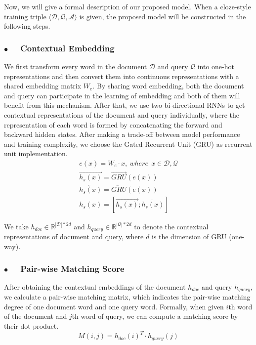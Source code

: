 \documentclass[11pt,a4paper]{article}
\begin{document}
Now, we will give a formal description of our proposed model.
When a cloze-style training triple $\langle \mathcal D, \mathcal Q, \mathcal A \rangle$ is given, the proposed model will be constructed in the following steps.

\subsubsection*{$\bullet$~~ Contextual Embedding}
We first transform every word in the document $\mathcal D$ and query $\mathcal Q$ into one-hot representations and then convert them into continuous representations with a shared embedding matrix $W_e$. 
By sharing word embedding, both the document and query can participate in the learning of embedding and both of them will benefit from this mechanism. 
After that, we use two bi-directional RNNs to get contextual representations of the document and query individually, where the representation of each word is formed by concatenating the forward and backward hidden states.
After making a trade-off between model performance and training complexity, we choose the Gated Recurrent Unit (GRU) \cite{cho-etal-2014} as recurrent unit implementation.
\begin{gather}
e(x) = W_e \cdot x,~where~~x\in \mathcal D , \mathcal Q \\
\overrightarrow{h_s(x)} =  \overrightarrow{GRU}(e(x)) \\
\overleftarrow{h_s(x)} = \overleftarrow{GRU}(e(x)) \\
h_s(x) = [\overrightarrow{h_s(x)}; \overleftarrow{h_s(x)}]
\end{gather}

We take $h_{doc}\in\mathbb{R}^{|\mathcal D|*2d}$ and $h_{query}\in\mathbb{R}^{|\mathcal Q|*2d}$ to denote the contextual representations of document and query, where $d$ is the dimension of GRU (one-way).


\subsubsection*{$\bullet$~~ Pair-wise Matching Score}
After obtaining the contextual embeddings of the document $h_{doc}$ and query $h_{query}$, we calculate a pair-wise matching matrix, which indicates the pair-wise matching degree of one document word and one query word. Formally, when given $i$th word of the document and $j$th word of query, we can compute a matching score by their dot product.
\begin{equation} M(i,j) = h_{doc}(i)^{T} \cdot h_{query}(j) \end{equation}
\end{document}
